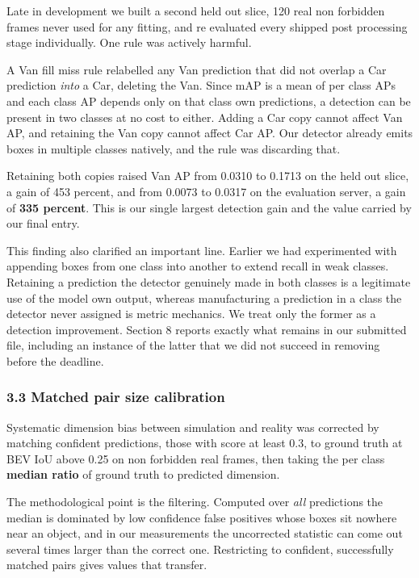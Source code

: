 \documentclass[
  10pt,
]{article}
\begin{document}
Late in development we built a second held out slice, 120 real non
forbidden frames never used for any fitting, and re evaluated every
shipped post processing stage individually. One rule was actively
harmful.

A Van fill miss rule relabelled any Van prediction that did not overlap
a Car prediction \emph{into} a Car, deleting the Van. Since mAP is a
mean of per class APs and each class AP depends only on that class own
predictions, a detection can be present in two classes at no cost to
either. Adding a Car copy cannot affect Van AP, and retaining the Van
copy cannot affect Car AP. Our detector already emits boxes in multiple
classes natively, and the rule was discarding that.

Retaining both copies raised Van AP from 0.0310 to 0.1713 on the held
out slice, a gain of 453 percent, and from 0.0073 to 0.0317 on the
evaluation server, a gain of \textbf{335 percent}. This is our single
largest detection gain and the value carried by our final entry.

This finding also clarified an important line. Earlier we had
experimented with appending boxes from one class into another to extend
recall in weak classes. Retaining a prediction the detector genuinely
made in both classes is a legitimate use of the model own output,
whereas manufacturing a prediction in a class the detector never
assigned is metric mechanics. We treat only the former as a detection
improvement. Section 8 reports exactly what remains in our submitted
file, including an instance of the latter that we did not succeed in
removing before the deadline.

\subsubsection{3.3 Matched pair size
calibration}\label{matched-pair-size-calibration}

Systematic dimension bias between simulation and reality was corrected
by matching confident predictions, those with score at least 0.3, to
ground truth at BEV IoU above 0.25 on non forbidden real frames, then
taking the per class \textbf{median ratio} of ground truth to predicted
dimension.

The methodological point is the filtering. Computed over \emph{all}
predictions the median is dominated by low confidence false positives
whose boxes sit nowhere near an object, and in our measurements the
uncorrected statistic can come out several times larger than the correct
one. Restricting to confident, successfully matched pairs gives values
that transfer.
\end{document}

